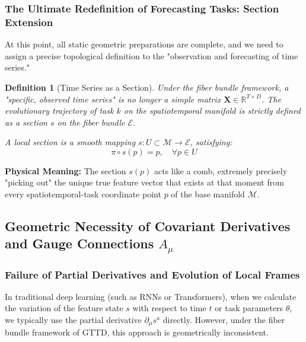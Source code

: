\documentclass{article}
\newtheorem{definition}{Definition}[section]
\begin{document}
\subsubsection{The Ultimate Redefinition of Forecasting Tasks: Section Extension}

At this point, all static geometric preparations are complete, and we need to assign a precise topological definition to the "observation and forecasting of time series."

\begin{definition}[Time Series as a Section]
Under the fiber bundle framework, a "specific, observed time series" is no longer a simple matrix $\mathbf{X} \in \mathbb{R}^{T \times D}$. The evolutionary trajectory of task $k$ on the spatiotemporal manifold is strictly defined as a section $s$ on the fiber bundle $\mathcal{E}$.

A local section is a smooth mapping $s: U \subset \mathcal{M} \to \mathcal{E}$, satisfying:
\begin{equation}
\pi \circ s(p) = p, \quad \forall p \in U
\end{equation}
\end{definition}

\noindent \textbf{Physical Meaning:} The section $s(p)$ acts like a comb, extremely precisely "picking out" the unique true feature vector that exists at that moment from every spatiotemporal-task coordinate point $p$ of the base manifold $\mathcal{M}$.

\subsection{Geometric Necessity of Covariant Derivatives and Gauge Connections \texorpdfstring{$A_\mu$}{A-mu}}

\subsubsection{Failure of Partial Derivatives and Evolution of Local Frames}

In traditional deep learning (such as RNNs or Transformers), when we calculate the variation of the feature state $s$ with respect to time $t$ or task parameters $\theta$, we typically use the partial derivative $\partial_\mu s^a$ directly. However, under the fiber bundle framework of GTTD, this approach is geometrically inconsistent.
\end{document}

